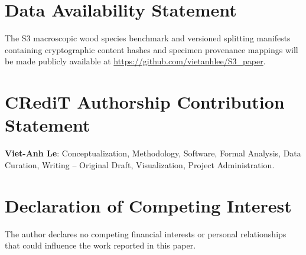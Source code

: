 \section*{Data Availability Statement}
The S3 macroscopic wood species benchmark and versioned splitting manifests containing cryptographic content hashes and specimen provenance mappings will be made publicly available at \url{https://github.com/vietanhlee/S3_paper}.

\section*{CRediT Authorship Contribution Statement}
\textbf{Viet-Anh Le}: Conceptualization, Methodology, Software, Formal Analysis, Data Curation, Writing -- Original Draft, Visualization, Project Administration.

\section*{Declaration of Competing Interest}
The author declares no competing financial interests or personal relationships that could influence the work reported in this paper.
